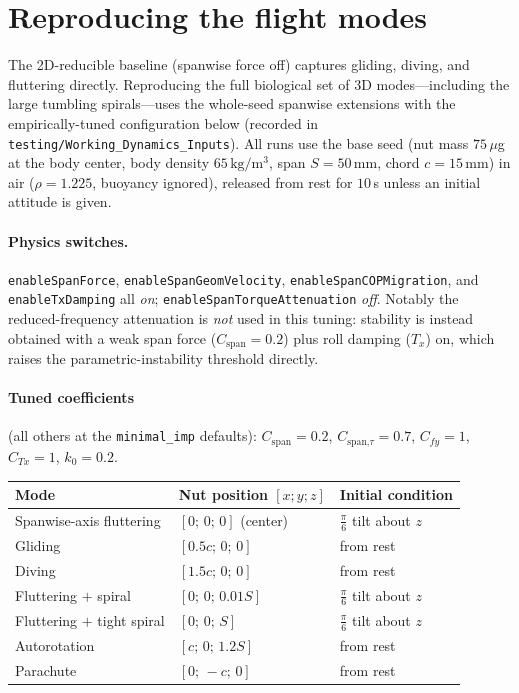 \documentclass[11pt]{article}
\begin{document}
\section*{Reproducing the flight modes}
The 2D-reducible baseline (spanwise force off) captures gliding, diving, and fluttering
directly. Reproducing the full biological set of 3D modes---including the large tumbling
spirals---uses the whole-seed spanwise extensions with the empirically-tuned configuration
below (recorded in \texttt{testing/Working\_Dynamics\_Inputs}). All runs use the base seed
(nut mass $75\,\mu$g at the body center, body density $65\,\mathrm{kg/m^3}$, span $S=50$\,mm,
chord $c=15$\,mm) in air ($\rho=1.225$, buoyancy ignored), released from rest for $10$\,s
unless an initial attitude is given.

\paragraph{Physics switches.} \texttt{enableSpanForce}, \texttt{enableSpanGeomVelocity},
\texttt{enableSpanCOPMigration}, and \texttt{enableTxDamping} all \emph{on};
\texttt{enableSpanTorqueAttenuation} \emph{off}. Notably the reduced-frequency attenuation is
\emph{not} used in this tuning: stability is instead obtained with a weak span force
($C_{\text{span}}=0.2$) plus roll damping ($T_x$) on, which raises the parametric-instability
threshold directly.

\paragraph{Tuned coefficients} (all others at the \texttt{minimal\_imp} defaults):
$C_{\text{span}}=0.2$, $C_{\text{span,}\tau}=0.7$, $C_{fy}=1$, $C_{Tx}=1$, $k_0=0.2$.

\begin{tabularx}{\textwidth}{@{} l l L @{}}
\toprule
\textbf{Mode} & \textbf{Nut position $[x;y;z]$} & \textbf{Initial condition} \\
\midrule
Spanwise-axis fluttering   & $[0;\,0;\,0]$ (center) & $\tfrac\pi6$ tilt about $z$ \\
Gliding                    & $[0.5c;\,0;\,0]$       & from rest \\
Diving                     & $[1.5c;\,0;\,0]$       & from rest \\
Fluttering $+$ spiral      & $[0;\,0;\,0.01S]$      & $\tfrac\pi6$ tilt about $z$ \\
Fluttering $+$ tight spiral& $[0;\,0;\,S]$          & $\tfrac\pi6$ tilt about $z$ \\
Autorotation               & $[c;\,0;\,1.2S]$       & from rest \\
Parachute                  & $[0;\,-c;\,0]$         & from rest \\
\bottomrule
\end{tabularx}
\end{document}
